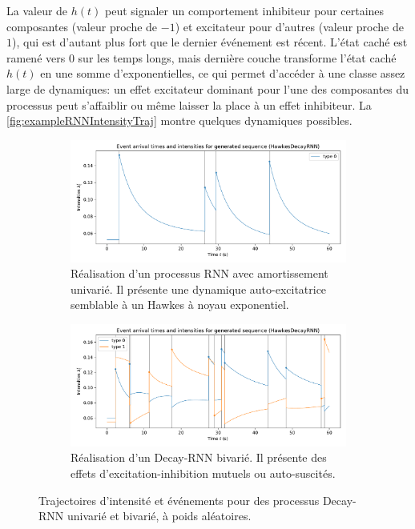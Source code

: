 \documentclass[../main.tex]{subfiles}
\begin{document}
La valeur de $h(t)$ peut signaler un comportement inhibiteur pour certaines composantes (valeur proche de $-1$) et excitateur pour d'autres (valeur proche de $1$), qui est d'autant plus fort que le dernier événement est récent. L'état caché est ramené vers $0$ sur les temps longs, mais dernière couche transforme l'état caché $h(t)$ en une somme d'exponentielles, ce qui permet d'accéder à une classe assez large de dynamiques: un effet excitateur dominant pour l'une des composantes du processus peut s'affaiblir ou même laisser la place à un effet inhibiteur. La \autoref{fig:exampleRNNIntensityTraj} montre quelques dynamiques possibles.

\begin{figure}[ht]
	\begin{subfigure}{\linewidth}
		\includegraphics[width=\linewidth]{../notebooks/example_rnnplot.pdf}
		\caption{Réalisation d'un processus RNN avec amortissement univarié. Il présente une dynamique auto-excitatrice semblable à un Hawkes à noyau exponentiel.}
	\end{subfigure}
	\begin{subfigure}{\linewidth}
		\includegraphics[width=\linewidth]{../notebooks/example_rnnplot2d.pdf}
		\caption{Réalisation d'un Decay-RNN bivarié. Il présente des effets d'excitation-inhibition mutuels ou auto-suscités.}
	\end{subfigure}
	\caption{Trajectoires d'intensité et événements pour des processus Decay-RNN univarié et bivarié, à poids aléatoires.}\label{fig:exampleRNNIntensityTraj}
\end{figure}
\end{document}
